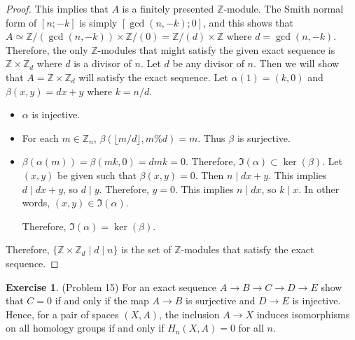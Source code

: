\documentclass[12pt, psamsfonts]{amsart}
\theoremstyle{definition}
\newtheorem*{exer}{Exercise}
\theoremstyle{remark}
\numberwithin{equation}{section}
\begin{document}
\begin{proof}
  This implies that $A$ is a finitely presented $\mathbb{Z}$-module.
  The Smith normal form of $[n; -k]$ is simply $[\gcd(n, -k); 0]$, and this shows that $A \simeq \mathbb{Z} / (\gcd(n, -k)) \times \mathbb{Z} / (0) = \mathbb{Z}/(d) \times \mathbb{Z}$ where $d = \gcd(n, -k)$.
  Therefore, the only $\mathbb{Z}$-modules that might satisfy the given exact sequence is $\mathbb{Z} \times \mathbb{Z}_d$ where $d$ is a divisor of $n$.
  Let $d$ be any divisor of $n$.
  Then we will show that $A = \mathbb{Z} \times \mathbb{Z}_d$ will satisfy the exact sequence.
  Let $\alpha(1) = (k, 0)$ and $\beta(x, y) = dx + y$ where $k = n / d$.
  \begin{itemize}
    \item
      $\alpha$ is injective.
    \item
      For each $m \in \mathbb{Z}_n$, $\beta(\lfloor m / d\rfloor, m \% d) = m$.
      Thus $\beta$ is surjective.
    \item
      $\beta(\alpha(m)) = \beta(mk, 0) = dmk = 0$.
      Therefore, $\Im(\alpha) \subset \ker(\beta)$.
      Let $(x, y)$ be given such that $\beta(x, y) = 0$.
      Then $n \mid dx + y$.
      This implies $d \mid dx + y$, so $d \mid y$.
      Therefore, $y = 0$.
      This implies $n \mid dx$, so $k \mid x$.
      In other words, $(x, y) \in \Im(\alpha)$.

      Therefore, $\Im(\alpha) = \ker(\beta)$.
  \end{itemize}
  Therefore, $\{ \mathbb{Z} \times \mathbb{Z}_d \mid d \mid n \}$ is the set of $\mathbb{Z}$-modules that satisfy the exact sequence.
\end{proof}

\begin{exer}{(Problem 15)}
  For an exact sequence $A \rightarrow B \rightarrow C \rightarrow D \rightarrow E$ show that $C = 0$ if and only if the map $A \rightarrow B$ is surjective and $D \rightarrow E$ is injective.
  Hence, for a pair of spaces $(X, A)$, the inclusion $A \rightarrow X$ induces isomorphisms on all homology groups if and only if $H_n(X, A) = 0$ for all $n$.
\end{exer}
\end{document}
